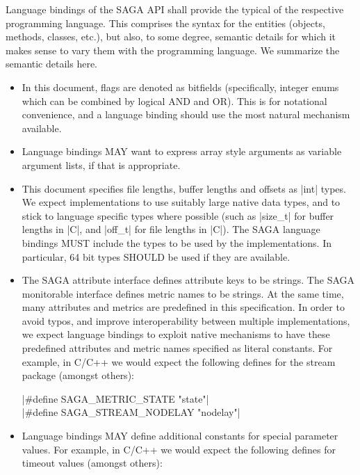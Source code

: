    Language bindings of the SAGA API shall provide the typical
   \LF of the respective programming language.  This comprises
   the syntax for the entities (objects, methods, classes,
   etc.), but also, to some degree, semantic details for which
   it makes sense to vary them with the programming language.
   We summarize the semantic details here.

   \begin{itemize}

   \item   
   In this document, flags are denoted as bitfields
   (specifically, integer enums which can be combined by logical
   AND and OR). This is for notational convenience, and
   a language binding should use the most natural mechanism
   available.

   \item 
   Language bindings MAY want to express array style arguments
   as variable argument lists, if that is appropriate.

   \item    
   This document specifies file lengths, buffer lengths and
   offsets as |int| types.  We expect implementations
   to use suitably large native data types, and to
   stick to language specific types where possible (such as
   |size_t| for buffer lengths in |C|, and |off_t| for file
   lengths in |C|).  The SAGA language bindings MUST include the
   types to be used by the implementations.  In particular, 64
   bit types SHOULD be used if they are available.

   \item    The SAGA attribute interface defines attribute keys
   to be strings.  The SAGA monitorable interface defines metric
   names to be strings.  At the same time, many attributes and
   metrics are predefined in this specification.  In order to
   avoid typos, and improve interoperability between multiple
   implementations, we expect language bindings to exploit
   native mechanisms to have these predefined
   attributes and metric names specified as literal constants.
   For example, in C/C++ we would expect the following defines
   for the stream package (amongst others):

   \shift |#define SAGA_METRIC_STATE    "state"|\\
   \shift |#define SAGA_STREAM_NODELAY  "nodelay"|

   \item Language bindings MAY define additional constants
   for special parameter values.  For example, in C/C++ we would
   expect the following defines for timeout values (amongst
   others):


\end{itemize}
